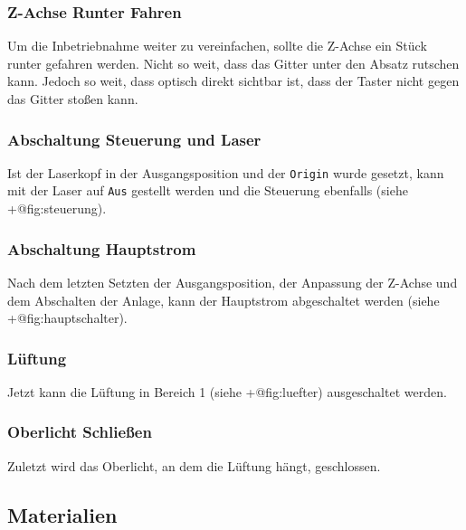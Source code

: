 \documentclass[]{article}
\begin{document}
\hypertarget{z-achse-runter-fahren}{%
\subsubsection{Z-Achse Runter Fahren}\label{z-achse-runter-fahren}}

Um die Inbetriebnahme weiter zu vereinfachen, sollte die Z-Achse ein
Stück runter gefahren werden. Nicht so weit, dass das Gitter unter den
Absatz rutschen kann. Jedoch so weit, dass optisch direkt sichtbar ist,
dass der Taster nicht gegen das Gitter stoßen kann.

\hypertarget{abschaltung-steuerung-und-laser}{%
\subsubsection{Abschaltung Steuerung und
Laser}\label{abschaltung-steuerung-und-laser}}

Ist der Laserkopf in der Ausgangsposition und der \texttt{Origin} wurde
gesetzt, kann mit der Laser auf \texttt{Aus} gestellt werden und die
Steuerung ebenfalls (siehe +@fig:steuerung).

\hypertarget{abschaltung-hauptstrom}{%
\subsubsection{Abschaltung Hauptstrom}\label{abschaltung-hauptstrom}}

Nach dem letzten Setzten der Ausgangsposition, der Anpassung der Z-Achse
und dem Abschalten der Anlage, kann der Hauptstrom abgeschaltet werden
(siehe +@fig:hauptschalter).

\hypertarget{luxfcftung-1}{%
\subsubsection{Lüftung}\label{luxfcftung-1}}

Jetzt kann die Lüftung in Bereich 1 (siehe +@fig:luefter) ausgeschaltet
werden.

\hypertarget{oberlicht-schlieuxdfen}{%
\subsubsection{Oberlicht Schließen}\label{oberlicht-schlieuxdfen}}

Zuletzt wird das Oberlicht, an dem die Lüftung hängt, geschlossen.

\hypertarget{materialien}{%
\subsection{Materialien}\label{materialien}}
\end{document}
